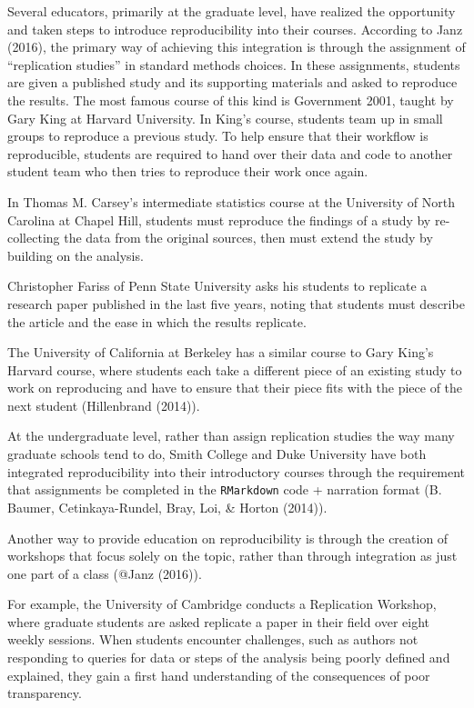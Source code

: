 \documentclass[12pt,twoside]{reedthesis}
\begin{document}
Several educators, primarily at the graduate level, have realized the
opportunity and taken steps to introduce reproducibility into their
courses. According to Janz (2016), the primary way of achieving this
integration is through the assignment of ``replication studies'' in
standard methods choices. In these assignments, students are given a
published study and its supporting materials and asked to reproduce the
results. The most famous course of this kind is Government 2001, taught
by Gary King at Harvard University. In King's course, students team up
in small groups to reproduce a previous study. To help ensure that their
workflow is reproducible, students are required to hand over their data
and code to another student team who then tries to reproduce their work
once again.

In Thomas M. Carsey's intermediate statistics course at the University
of North Carolina at Chapel Hill, students must reproduce the findings
of a study by re-collecting the data from the original sources, then
must extend the study by building on the analysis.

Christopher Fariss of Penn State University asks his students to
replicate a research paper published in the last five years, noting that
students must describe the article and the ease in which the results
replicate.

The University of California at Berkeley has a similar course to Gary
King's Harvard course, where students each take a different piece of an
existing study to work on reproducing and have to ensure that their
piece fits with the piece of the next student (Hillenbrand (2014)).

At the undergraduate level, rather than assign replication studies the
way many graduate schools tend to do, Smith College and Duke University
have both integrated reproducibility into their introductory courses
through the requirement that assignments be completed in the
\texttt{RMarkdown} code + narration format (B. Baumer, Cetinkaya-Rundel,
Bray, Loi, \& Horton (2014)).

Another way to provide education on reproducibility is through the
creation of workshops that focus solely on the topic, rather than
through integration as just one part of a class (@Janz (2016)).

For example, the University of Cambridge conducts a Replication
Workshop, where graduate students are asked replicate a paper in their
field over eight weekly sessions. When students encounter challenges,
such as authors not responding to queries for data or steps of the
analysis being poorly defined and explained, they gain a first hand
understanding of the consequences of poor transparency.
\end{document}
